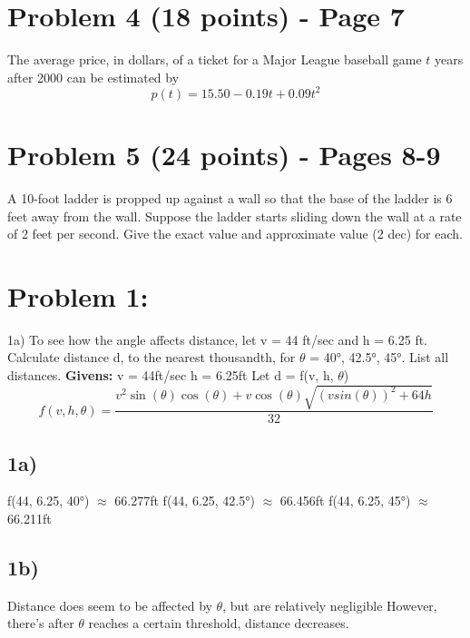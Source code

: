 \documentclass{article}
\begin{document}
\section*{Problem 4 (18 points) - Page 7}
The average price, in dollars, of a ticket for a Major League baseball game \(t\) years after 2000 can be estimated by
\begin{equation}
    p(t) = 15.50 - 0.19t + 0.09t^2
\end{equation}

\section*{Problem 5 (24 points) - Pages 8-9}
A 10-foot ladder is propped up against a wall so that the base of the ladder is 6 feet away from the wall. Suppose the ladder starts sliding down the wall at a rate of 2 feet per second. Give the exact value and approximate value (2 dec) for each.

\newpage

\section*{Problem 1:}
1a) To see how the angle affects distance, let v = 44 ft/sec and h = 6.25 ft.
Calculate distance d, to the nearest thousandth, for $\theta$ = 40°, 42.5°, 45°. List all distances.
\newline \newline \textbf{Givens:}
\newline
v = 44ft/sec
\newline
h = 6.25ft
\newline \newline
Let d = f(v, h, $\theta$)
\begin{equation}
    f(v, h, \theta) = \frac{v^2 \sin(\theta) \cos(\theta) + v\cos(\theta) \sqrt{(vsin(\theta))^2 + 64h}}{32}
\end{equation}
\subsection*{1a)}
f(44, 6.25, 40°) $\approx$ 66.277ft
\newline
f(44, 6.25, 42.5°) $\approx$ 66.456ft
\newline
f(44, 6.25, 45°) $\approx$ 66.211ft
\subsection*{1b)}
Distance does seem to be affected by $\theta$, but are relatively negligible However, there's after $\theta$ reaches a certain threshold, distance decreases.
\end{document}
